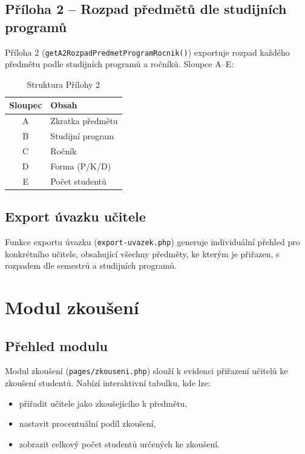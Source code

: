 \documentclass[12pt,a4paper]{report}
\begin{document}
\section{Příloha 2 -- Rozpad předmětů dle studijních programů}

Příloha 2 (\texttt{getA2RozpadPredmetProgramRocnik()}) exportuje rozpad každého předmětu podle studijních programů a ročníků. Sloupce A--E:

\begin{table}[H]
\centering
\begin{tabular}{cl}
\toprule
\textbf{Sloupec} & \textbf{Obsah} \\
\midrule
A & Zkratka předmětu \\
B & Studijní program \\
C & Ročník \\
D & Forma (P/K/D) \\
E & Počet studentů \\
\bottomrule
\end{tabular}
\caption{Struktura Přílohy 2}
\end{table}

\section{Export úvazku učitele}

Funkce exportu úvazku (\texttt{export-uvazek.php}) generuje individuální přehled pro konkrétního učitele, obsahující všechny předměty, ke kterým je přiřazen, s rozpadem dle semestrů a studijních programů.

\chapter{Modul zkoušení}

\section{Přehled modulu}

Modul zkoušení (\texttt{pages/zkouseni.php}) slouží k evidenci přiřazení učitelů ke zkoušení studentů. Nabízí interaktivní tabulku, kde lze:
\begin{itemize}
  \item přiřadit učitele jako zkoušejícího k předmětu,
  \item nastavit procentuální podíl zkoušení,
  \item zobrazit celkový počet studentů určených ke zkoušení.
\end{itemize}
\end{document}
